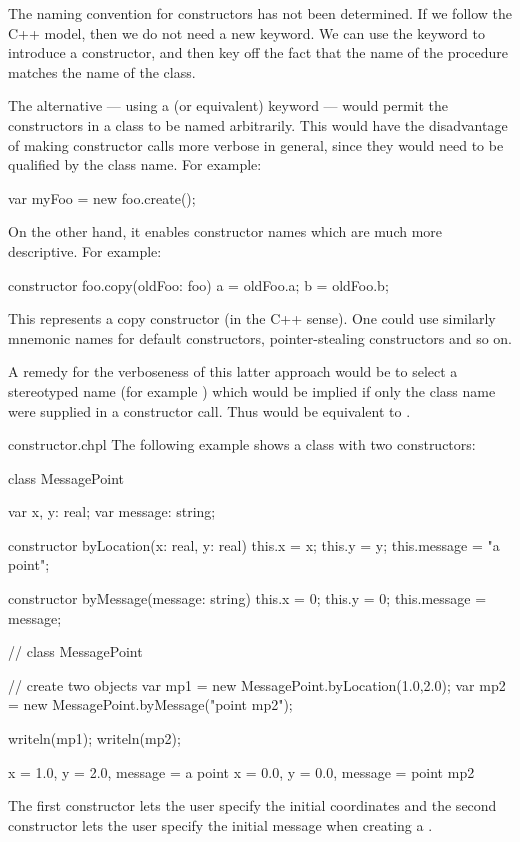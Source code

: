 \begin{openissue}
The naming convention for constructors has not been determined.  If we follow
the C++ model, then we do not need a new keyword.  We can use the 
keyword to introduce a constructor, and then key off the fact that the name of
the procedure matches the name of the class.

The alternative --- using a  (or equivalent) keyword --- would
permit the constructors in a class to be named arbitrarily.  This would have the
disadvantage of making constructor calls more verbose in general, since they
would need to be qualified by the class name.  For example:
\begin{chapel}
var myFoo = new foo.create();
\end{chapel}
On the other hand, it enables constructor names which are much more
descriptive.  For example:
\begin{chapel}
constructor foo.copy(oldFoo: foo) 
{ a = oldFoo.a; b = oldFoo.b; }
{ }
\end{chapel}
This represents a copy constructor (in the C++ sense).  One could use similarly
mnemonic names for default constructors, pointer-stealing constructors and so
on.  

A remedy for the verboseness of this latter approach would be to select a
stereotyped name (for example ) which would be implied if only
the class name were supplied in a constructor call.  Thus  would be equivalent to .
\end{openissue}

\begin{chapelexample}{constructor.chpl}
The following example shows a class with two constructors:
\begin{chapel}
class MessagePoint {
  var x, y: real;
  var message: string;

  constructor byLocation(x: real, y: real) 
  { this.x = x; this.y = y; this.message = "a point"; }
  {} 

  constructor byMessage(message: string) 
  { this.x = 0; this.y = 0; this.message = message; }
  {}
}  // class MessagePoint

// create two objects
var mp1 = new MessagePoint.byLocation(1.0,2.0);
var mp2 = new MessagePoint.byMessage("point mp2");
\end{chapel}
\begin{chapelpost}
writeln(mp1);
writeln(mp2);
\end{chapelpost}
\begin{chapeloutput}
{x = 1.0, y = 2.0, message = a point}
{x = 0.0, y = 0.0, message = point mp2}
\end{chapeloutput}
The first constructor lets the user specify the initial coordinates
and the second constructor lets the user specify the initial message
when creating a .
\end{chapelexample}

